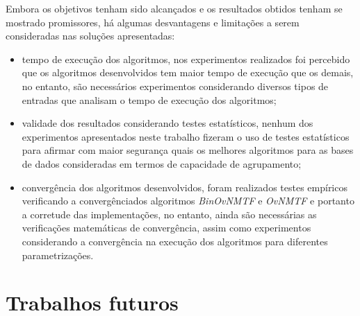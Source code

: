 \documentclass[
    12pt,                %
    oneside,            %
    a4paper,            %
    english,            %
    brazil                %
    ]{abntex2ppgsi}
\begin{document}
Embora os objetivos tenham sido alcançados e os resultados obtidos tenham se mostrado promissores, há algumas desvantagens e limitações a serem consideradas nas soluções apresentadas:

\begin{itemize}
    \item tempo de execução dos algoritmos, nos experimentos realizados foi percebido que os algoritmos desenvolvidos tem maior tempo de execução que os demais, no entanto, são necessários experimentos considerando diversos tipos de entradas que analisam o tempo de execução dos algoritmos;
    \item validade dos resultados considerando testes estatísticos, nenhum dos experimentos apresentados neste trabalho fizeram o uso de testes estatísticos para afirmar com maior segurança quais os melhores algoritmos para as bases de dados consideradas em termos de capacidade de agrupamento;
    \item convergência dos algoritmos desenvolvidos, foram realizados testes empíricos verificando a convergênciados algoritmos \textit{BinOvNMTF} e \textit{OvNMTF} e portanto a corretude das implementações, no entanto, ainda são necessárias as verificações matemáticas de convergência, assim como experimentos considerando a convergência na execução dos algoritmos para diferentes parametrizações.
\end{itemize}


\section{Trabalhos futuros}
\end{document}
